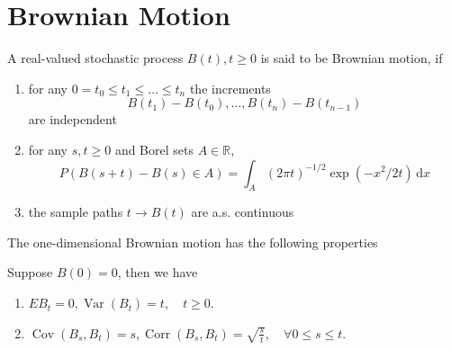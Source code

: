 \chapter{Brownian Motion}

\begin{definition}
    A real-valued stochastic process $B(t),t\geq 0$ is said to be Brownian motion, if
    \begin{enumerate}
        \item for any $0=t_{0}\leq t_{1}\leq\ldots\leq t_{n}$ the increments
              \begin{equation*}
                  B\left(t_{1}\right)-B\left(t_{0}\right),\ldots,B\left(t_{n}\right)-B\left(t_{n-1}\right)
              \end{equation*}
              are independent
        \item for any $s,t\geq 0$ and Borel sets $A\in\mathbb{R}$,
              \begin{equation}
                  P\left(B(s+t)-B(s)\in A\right)=\int_{A}(2\pi t)^{-1/2}\exp\left(-x^{2}/2t\right)\,\mathrm{d}x
              \end{equation}
        \item the sample paths $t\rightarrow B(t)$ are a.s. continuous
    \end{enumerate}
\end{definition}

The one-dimensional Brownian motion has the following properties

\begin{property}
    Suppose $B(0)=0$, then we have
    \begin{enumerate}
        \item $EB_{t}=0,\operatorname{Var}\left(B_{t}\right)=t,\quad t\geq 0$.
        \item $\operatorname{Cov}\left(B_{s},B_{t}\right)=s,\operatorname{Corr}\left(B_{s},B_{t}\right)=\sqrt{\frac{s}{t}},\quad\forall 0\leq s\leq t$.
    \end{enumerate}
\end{property}


